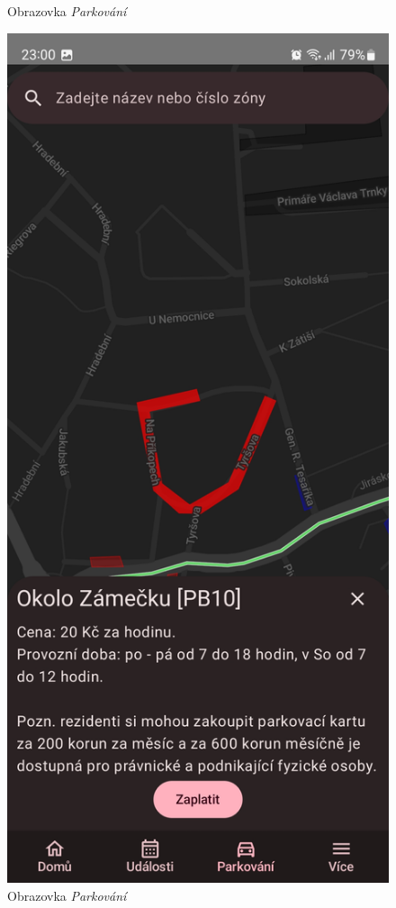 \begin{figure}[H]
  \caption{Obrazovka \textit{Parkování}}
\endminipage\hfill
{}
  \includegraphics[width=\linewidth]{screens/3b_B.jpg}
  \caption{Obrazovka \textit{Parkování}}
\endminipage\hfill
\end{figure}

